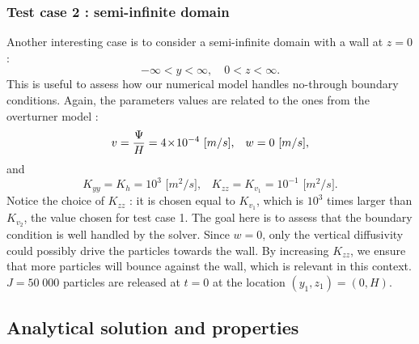 \subsubsection*{Test case 2 : semi-infinite domain}
Another interesting case is to consider a semi-infinite domain with a wall at $z=0$ :
\begin{equation}
	-\infty < y < \infty,\quad 0 < z < \infty.
\end{equation}
This is useful to assess how our numerical model handles no-through boundary conditions. Again, the parameters values are related to the ones from the overturner model :
\begin{equation}
	v = \frac{\Psi}{H} = 4\!\times\!10^{-4}\mbox{ [$m/s$],}\quad  w = 0\mbox{ [$m/s$],}
\end{equation}
and
\begin{equation}
	K_{yy} = K_h = 10^{3} \mbox{ [$m^2/s$],}\quad K_{zz} = K_{v_{1}} = 10^{-1} \mbox{ [$m^2/s$].} 
\end{equation}
Notice the choice  of $K_{zz}$ : it is chosen equal to $K_{v_1}$, which is $10^3$ times larger than $K_{v_2}$, the value chosen for test case 1. The goal here is to assess that the boundary condition is well handled by the solver. Since $w=0$, only the vertical diffusivity could possibly drive the particles towards the wall. By increasing $K_{zz}$, we ensure that more particles will bounce against the wall, which is relevant in this context. $J = 50\;000$ particles are released at $t=0$ at the location $(y_1,z_1) = (0,H)$.



\subsection*{Analytical solution and properties}
